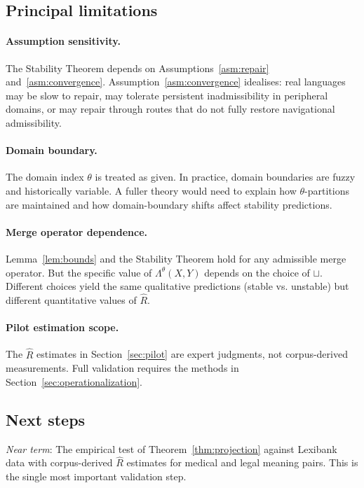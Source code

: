 \documentclass[12pt]{article}
\theoremstyle{rthm}
\theoremstyle{rdef}
\theoremstyle{remark}
\newcommand{\Lam}[1][\theta]{\Lambda^{#1}}
\begin{document}
\subsection{Principal limitations}

\paragraph{Assumption sensitivity.}
The Stability Theorem depends on Assumptions~\ref{asm:repair}
and~\ref{asm:convergence}. Assumption~\ref{asm:convergence} idealises: real
languages may be slow to repair, may tolerate persistent inadmissibility in
peripheral domains, or may repair through routes that do not fully restore
navigational admissibility.

\paragraph{Domain boundary.}
The domain index $\theta$ is treated as given. In practice, domain boundaries
are fuzzy and historically variable. A fuller theory would need to explain how
$\theta$-partitions are maintained and how domain-boundary shifts affect
stability predictions.

\paragraph{Merge operator dependence.}
Lemma~\ref{lem:bounds} and the Stability Theorem hold for any admissible merge
operator. But the specific value of $\Lam(X,Y)$ depends on the choice of
$\sqcup$. Different choices yield the same qualitative predictions (stable vs.
unstable) but different quantitative values of $\widehat{R}$.

\paragraph{Pilot estimation scope.}
The $\widehat{R}$ estimates in Section~\ref{sec:pilot} are expert judgments, not
corpus-derived measurements. Full validation requires the methods in
Section~\ref{sec:operationalization}.

\subsection{Next steps}

\emph{Near term}: The empirical test of Theorem~\ref{thm:projection} against
Lexibank data with corpus-derived $\widehat{R}$ estimates for medical and legal
meaning pairs. This is the single most important validation step.
\end{document}
